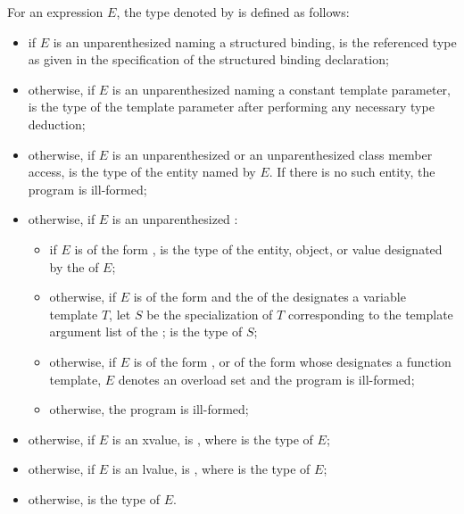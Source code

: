 \pnum
{}%
For an expression $E$, the type denoted by  is defined as follows:
\begin{itemize}
\item if $E$ is an unparenthesized 
naming a structured binding,
 is the referenced type as given in
the specification of the structured binding declaration;

\item otherwise, if $E$ is an unparenthesized 
naming a constant template parameter,
 is the type of the template parameter
after performing any necessary
type deduction;

\item otherwise, if $E$ is an unparenthesized  or
an unparenthesized
class
member access,  is the
type of the entity named by $E$.
If there is no such entity, the program is ill-formed;

\item otherwise, if $E$ is an unparenthesized :
\begin{itemize}
\item if $E$ is of the form ,
 is the type of the entity, object, or value
designated by the  of $E$;
\item otherwise, if $E$ is of the form
 and
the  of
the  designates
a variable template $T$,
let $S$ be the specialization of $T$ corresponding to
the template argument list of the ;
 is the type of $S$;
\item otherwise, if $E$ is of the form
, or
of the form 
whose  designates a function template,
$E$ denotes an overload set and
the program is ill-formed;
\item otherwise, the program is ill-formed;
\end{itemize}

\item otherwise, if $E$ is
an xvalue,  is , where  is the type
of $E$;

\item otherwise, if $E$ is an lvalue, 
is , where  is the type of $E$;

\item otherwise,  is the type of $E$.
\end{itemize}

